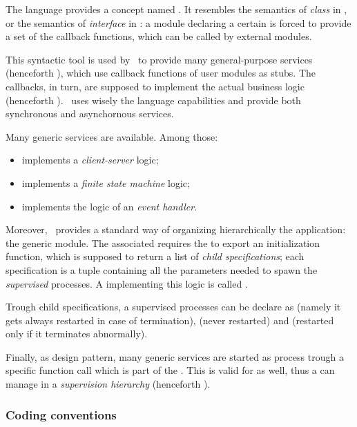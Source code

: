 The language provides a concept named . It resembles the
semantics of \emph{class} in , or the semantics of
\emph{interface} in : a module declaring a certain
 is forced to provide a set of the callback functions,
which can be called by external modules.

This syntactic tool is used by \OTP\ to provide many general-purpose
services (henceforth ), which use callback
functions of user modules as stubs. The callbacks, in turn, are supposed
to implement the actual business logic (henceforth ). \OTP\ uses wisely the language capabilities and
provide both synchronous and asynchornous services.

Many generic services are available. Among those:
\begin{itemize}
\item   {} implements a \emph{client-server} logic;
\item   {} implements a \emph{finite state machine} logic;
\item   {} implements the logic of an
        \emph{event handler}.
\end{itemize}

Moreover, \OTP\ provides a standard way of organizing hierarchically the
application: the generic  module. The associated
 requires the  to export an
initialization function, which is supposed to return a list of
\emph{child specifications}; each specification is a tuple containing all
the parameters needed to spawn the \emph{supervised} processes. A
 implementing this logic is called
.

Trough child specifications, a supervised processes can be declare as
 (namely it gets always restarted in case of
termination),  (never restarted) and
 (restarted only if it terminates abnormally).

Finally, as design pattern, many generic services are started as process
trough a specific function call which is part of the . This is valid for  as well, thus a
 can manage  in a
\emph{supervision hierarchy} (henceforth ).

\subsubsection{Coding conventions} \label{subsub:CodingConventions}

